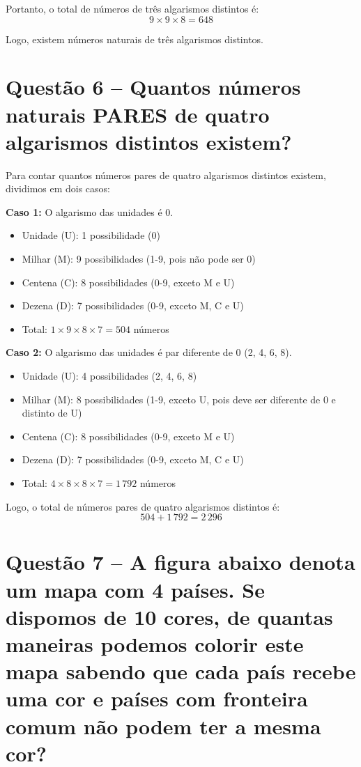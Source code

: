 \documentclass[12pt,a4paper]{article}
\begin{document}
    Portanto, o total de números de três algarismos distintos é:
    \[
    9 \times 9 \times 8 = 648
    \]
    
    Logo, existem  números naturais de três algarismos distintos.

\section*{Questão 6 -- Quantos números naturais PARES de quatro algarismos distintos existem?}

    Para contar quantos números pares de quatro algarismos distintos existem, dividimos em dois casos:

    \textbf{Caso 1:} O algarismo das unidades é 0.
    \begin{itemize}
        \item Unidade (U): 1 possibilidade (0)
        \item Milhar (M): 9 possibilidades (1-9, pois não pode ser 0)
        \item Centena (C): 8 possibilidades (0-9, exceto M e U)
        \item Dezena (D): 7 possibilidades (0-9, exceto M, C e U)
        \item Total: $1 \times 9 \times 8 \times 7 = 504$ números
    \end{itemize}

    \textbf{Caso 2:} O algarismo das unidades é par diferente de 0 (2, 4, 6, 8).
    \begin{itemize}
        \item Unidade (U): 4 possibilidades (2, 4, 6, 8)
        \item Milhar (M): 8 possibilidades (1-9, exceto U, pois deve ser diferente de 0 e distinto de U)
        \item Centena (C): 8 possibilidades (0-9, exceto M e U)
        \item Dezena (D): 7 possibilidades (0-9, exceto M, C e U)
        \item Total: $4 \times 8 \times 8 \times 7 = 1\,792$ números
    \end{itemize}

    Logo, o total de números pares de quatro algarismos distintos é:
    \[
    504 + 1\,792 = \boxed{2\,296}
    \]

\section*{Questão 7 -- A figura abaixo denota um mapa com 4 países. Se dispomos de 10 cores, de
quantas maneiras podemos colorir este mapa sabendo que cada país recebe
uma cor e países com fronteira comum não podem ter a mesma cor?}
\end{document}
